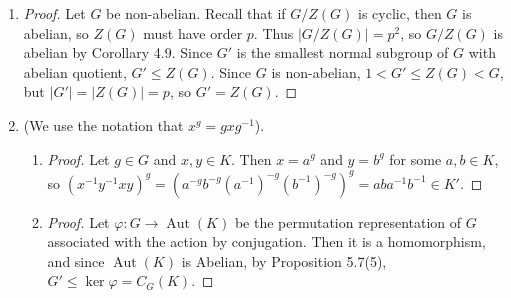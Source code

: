 \documentclass[11pt, letterpaper]{article}
\begin{document}
\begin{enumerate}
\begin{enumerate}
\begin{proof}
      The kernel of $\varphi$ is the set of automorphisms that fix $H$ and $K$, that is $\sigma$ such that $\sigma|_H = 1$ and $\sigma|_K = 1$. Since $G = H \times K$, it must be that $\sigma = 1$. Thus $\varphi$ is injective.

      To show that $\varphi$ is surjective, note that given $h \in \operatorname{Aut}(H)$ and $k \in \operatorname{Aut}(K)$, we can define $\sigma \in \operatorname{Aut}(G)$ by $\sigma = h \cup k$ since $H \cap K = 1$. Thus $\varphi$ is surjective, and thus bijective, so $\operatorname{Aut}(G) \cong \operatorname{Aut}(H) \times \operatorname{Aut}(K)$.
    \end{proof}

    \item \begin{proof}
      By induction on the number of Sylow subgroups of $G$. The base case of $n = 1$ is trivial. Suppose $G$ is finite abelian so that it has $n > 1$ distinct Sylow subgroups $P_1, \dots, P_n$ and that the statement holds for finite abelian groups of order less than $n$. Consider $G/P_1$. By the induction hypothesis, $\operatorname{Aut}(G/P_1) \cong \operatorname{Aut}(P_2) \times \dots \times \operatorname{Aut}(P_n)$. As in (b), $G/P_i \cap P_i = 1$ and are characteristic, so by (b) $\operatorname{Aut}(G) \cong \operatorname{Aut}(P_1) \times \dots \times \operatorname{Aut}(P_n)$.
    \end{proof}
  \end{enumerate}

  \item \begin{proof}
    Let $G$ be non-abelian. Recall that if $G/Z(G)$ is cyclic, then $G$ is abelian, so $Z(G)$ must have order $p$. Thus $\vert G/Z(G) \vert = p^2$, so $G/Z(G)$ is abelian by Corollary 4.9. Since $G'$ is the smallest normal subgroup of $G$ with abelian quotient, $G' \leq Z(G)$. Since $G$ is non-abelian, $1 < G' \leq Z(G) < G$, but $\vert G' \vert = \vert Z(G) \vert = p$, so $G' = Z(G)$.
  \end{proof}

  \item (We use the notation that $x^g = gxg^{-1}$). 
  \begin{enumerate}
    \item \begin{proof}
      Let $g \in G$ and $x, y \in K$. Then $x = a^g$ and $y = b^g$ for some $a, b \in K$, so $(x^{-1}y^{-1}xy)^g = (a^{-g}b^{-g}(a^{-1})^{-g}(b^{-1})^{-g})^g = aba^{-1}b^{-1} \in K'$.
    \end{proof}
    \item \begin{proof}
      Let $\varphi: G \to \operatorname{Aut}(K)$ be the permutation representation of $G$ associated with the action by conjugation. Then it is a homomorphism, and since $\operatorname{Aut}(K)$ is Abelian, by Proposition 5.7(5), $G' \leq \operatorname{ker} \varphi = C_G(K)$.
    \end{proof}
  \end{enumerate}


\end{enumerate}
\end{document}
